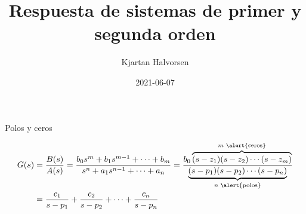 \documentclass[dvisvgm,hypertex,aspectratio=169]{beamer}
\author{Kjartan Halvorsen}
\date{2021-06-07}
\title{Respuesta de sistemas de primer y segunda orden}
\begin{document}
\maketitle


\begin{frame}[label=PZ0]{Polos y ceros}

  \begin{align*}
    G(s) &= \frac{B(s)}{A(s)} = \frac{b_0s^m + b_1s^{m-1} + \cdots + b_m }{s^n + a_1s^{n-1} + \cdots + a_n } = \frac{ b_0\overbrace{(s-z_1)(s-z_2)\cdots (s-z_m)}^{\text{\(m\) \alert{ceros}}}}{ \underbrace{(s-p_1)(s-p_2)\cdots(s-p_n)}_{\text{\(n\) \alert{polos}}}}\\
    &= \frac{c_1}{s-p_1} + \frac{c_2}{s-p_2} + \cdots +\frac{c_n}{s-p_n} 
  \end{align*}
\end{frame}
\end{document}
